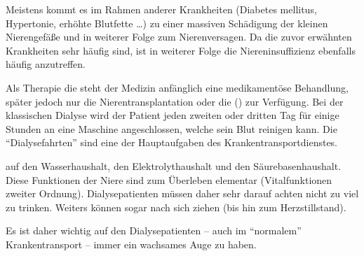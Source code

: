 
Meistens kommt es im Rahmen anderer Krankheiten
(Diabetes mellitus, Hypertonie, erhöhte Blutfette \ldots) zu einer massiven
Schädigung der kleinen Nierengefäße und in weiterer Folge zum Nierenversagen. Da
die zuvor erwähnten Krankheiten sehr häufig sind, ist in weiterer Folge die
Niereninsuffizienz ebenfalls häufig anzutreffen. 

Als Therapie die steht der
Medizin anfänglich eine medikamentöse Behandlung, später jedoch nur die
Nierentransplantation oder die 
() zur Verfügung. Bei der
klassischen Dialyse wird der Patient jeden zweiten oder
dritten Tag für einige Stunden an eine Maschine angeschlossen, welche sein
Blut reinigen kann. Die "`Dialysefahrten"' sind eine der
Hauptaufgaben des Krankentransportdienstes.

 auf den Wasserhaushalt, den
Elektrolythaushalt und den Säurebasenhaushalt. Diese Funktionen der Niere sind zum Überleben elementar (Vitalfunktionen zweiter
Ordnung). Dialysepatienten müssen daher sehr darauf achten
nicht zu viel zu trinken. Weiters können  sogar
 nach sich ziehen (bis hin
zum Herzstillstand).

Es ist daher wichtig auf den
Dialysepatienten -- auch im "`normalem"' Krankentransport --
immer ein wachsames Auge zu haben.







% 
% 
% 
% 
% 
% 
% 
% 




